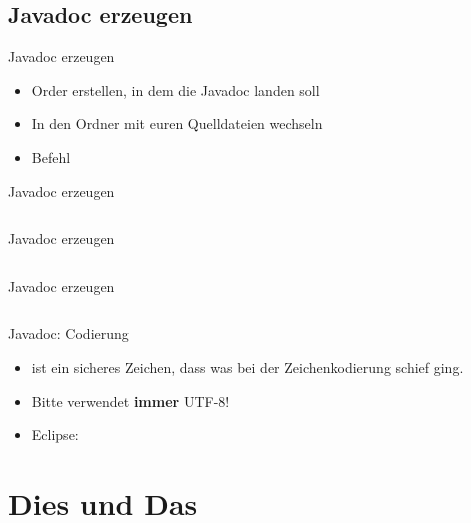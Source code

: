 \documentclass[usepdftitle=false,hyperref={pdfpagelabels=false}]{beamer}
\newcommand{\quem}{\tikz[baseline=(wi.base)]{\node[fill=black,rotate=45,inner sep=1.5mm] {};%
\node[ font=\color{white}] (wi) {?};}}
\begin{document}
\subsection{Javadoc erzeugen}
\begin{frame}{Javadoc erzeugen}
    \begin{itemize}
        \item Order erstellen, in dem die Javadoc landen soll
        \item In den Ordner mit euren Quelldateien wechseln
        \item Befehl 
    \end{itemize}
\end{frame}
\begin{frame}{Javadoc erzeugen}
    \inputminted[linenos=true, numbersep=5pt, tabsize=4, firstline=1, lastline=30, fontsize=\tiny]{console}{javadoc.sh-session}
\end{frame}
\begin{frame}{Javadoc erzeugen}
    \inputminted[linenos=true, numbersep=5pt, tabsize=4, firstline=31, firstnumber=31, lastline=59, fontsize=\tiny]{console}{javadoc.sh-session}
\end{frame}
\begin{frame}{Javadoc erzeugen}
    \inputminted[linenos=true, numbersep=5pt, tabsize=4, firstline=60, firstnumber=60, lastline=82, fontsize=\tiny]{console}{javadoc.sh-session}
\end{frame}
\begin{frame}{Javadoc: Codierung}
    \begin{itemize}[<+->]
        \item \quem{} ist ein sicheres Zeichen, dass was bei der
              Zeichenkodierung schief ging.
        \item Bitte verwendet \textbf{immer} UTF-8!
        \item Eclipse: 
    \end{itemize}
\end{frame}

\section{Dies und Das}
\end{document}
